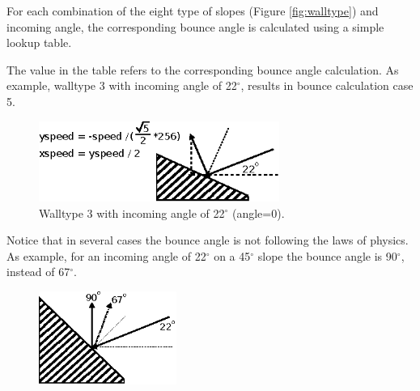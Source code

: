 \documentclass[book.tex]{subfiles}
\begin{document}
For each combination of the eight type of slopes (Figure \ref{fig:walltype}) and incoming angle, the corresponding bounce angle is calculated using a simple lookup table.\\

\par
\begin{minipage}{\textwidth}
  
\end{minipage}
\par

The value in the table refers to the corresponding bounce angle calculation. As example, walltype 3 with incoming angle of 22$^{\circ}$, results in bounce calculation case 5.

\par
\begin{figure}[H]
\centering
\includegraphics[width=0.7\textwidth]{imgs/drawings/bounce_angle.eps}
\caption{Walltype 3 with incoming angle of 22$^{\circ}$ (angle=0).}
\label{fig:bounce_angles}
\end{figure}
\par

\par
\begin{minipage}{\textwidth}
  
\end{minipage}
\par

Notice that in several cases the bounce angle is not following the laws of physics. As example, for an incoming angle of 22$^{\circ}$ on a 45$^{\circ}$ slope the bounce angle is 90$^{\circ}$, instead of 67$^{\circ}$.
\par
\begin{figure}[H]
\centering
\includegraphics[width=0.4\textwidth]{imgs/drawings/bounce_physics.eps}
\end{figure}
\par
\end{document}
